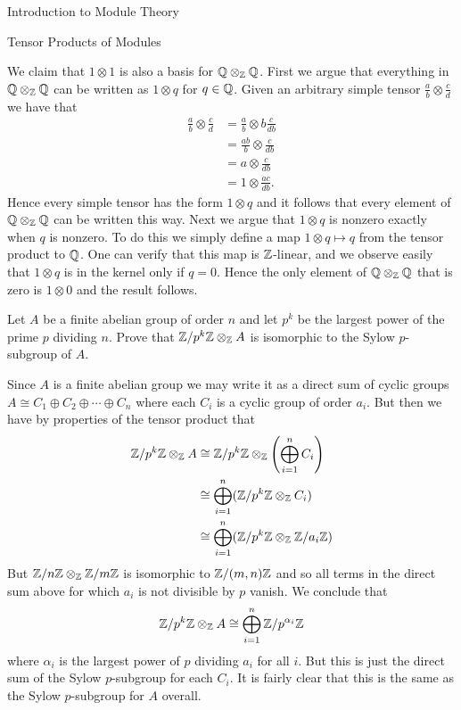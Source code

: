 \begin{chapter}{Introduction to Module Theory}
\begin{section}{Tensor Products of Modules}
\begin{solution}
We claim that $1\otimes 1$ is also a basis for $\mathbb{Q}\otimes _{\mathbb{Z}} \mathbb{Q}$. First we argue that everything in $\mathbb{Q}\otimes_{\mathbb{Z}}\mathbb{Q}$ can be written as $1\otimes q$ for $q\in \mathbb{Q}$. Given an arbitrary simple tensor $\frac{a}{b}\otimes \frac{c}{d}$ we have that \begin{align*}
\frac{a}{b}\otimes \frac{c}{d} & = \frac{a}{b}\otimes b\frac{c}{db}\\
& = \frac{ab}{b}\otimes \frac{c}{db}\\
& = a\otimes\frac{c}{db}\\
& = 1\otimes \frac{ac}{db}.
\end{align*}
Hence every simple tensor has the form $1\otimes q$ and it follows that every element of $\mathbb{Q}\otimes_{\mathbb{Z}}\mathbb{Q}$ can be written this way. Next we argue that $1\otimes q$ is nonzero exactly when $q$ is nonzero. To do this we simply define a map $1\otimes q\mapsto q$ from the tensor product to $\mathbb{Q}$. One can verify that this map is $\mathbb{Z}$-linear, and we observe easily that $1\otimes q$ is in the kernel only if $q=0$. Hence the only element of $\mathbb{Q}\otimes_{\mathbb{Z}}\mathbb{Q}$ that is zero is $1\otimes 0$ and the result follows.

\end{solution}\oneperpage



\begin{problem}\label{ex:10.4.5}
Let $A$ be a finite abelian group of order $n$ and let $p^k$ be the largest power of the prime $p$ dividing $n$. Prove that $\mathbb{Z}/p^k\mathbb{Z}\otimes_{\mathbb{Z}} A$ is isomorphic to the Sylow $p$-subgroup of $A$. 
\end{problem}
\begin{solution}Since $A$ is a finite abelian group we may write it as a direct sum of cyclic groups $A \cong C_1\oplus C_2\oplus\cdots \oplus C_n$ where each $C_i$ is a cyclic group of order $a_i$. But then we have by properties of the tensor product that \begin{align*}
\mathbb{Z}/p^k\mathbb{Z}\otimes_{\mathbb{Z}} A &\cong \mathbb{Z}/p^k\mathbb{Z}\otimes_{\mathbb{Z}} \left(\bigoplus_{i=1}^n C_i\right)\\
& \cong \bigoplus_{i=1}^n (\mathbb{Z}/p^k\mathbb{Z}\otimes_{\mathbb{Z}} C_i)\\
& \cong \bigoplus_{i=1}^n (\mathbb{Z}/p^k\mathbb{Z}\otimes_{\mathbb{Z}} \mathbb{Z}/a_i\mathbb{Z})
\end{align*}
But $\mathbb{Z}/n\mathbb{Z} \otimes_{\mathbb{Z}} \mathbb{Z}/m\mathbb{Z}$ is isomorphic to $\mathbb{Z}/(m,n)\mathbb{Z}$ and so all terms in the direct sum above for which $a_i$ is not divisible by $p$ vanish. We conclude that \[
\mathbb{Z}/p^k\mathbb{Z}\otimes_{\mathbb{Z}} A\cong \bigoplus_{i=1}^n \mathbb{Z}/p^{\alpha_i}\mathbb{Z}
\]
where $\alpha_i$ is the largest power of $p$ dividing $a_i$ for all $i$. But this is just the direct sum of the Sylow $p$-subgroup for each $C_i$. It is fairly clear that this is the same as the Sylow $p$-subgroup for $A$ overall. 



\end{solution}
\end{section}
\end{chapter}
